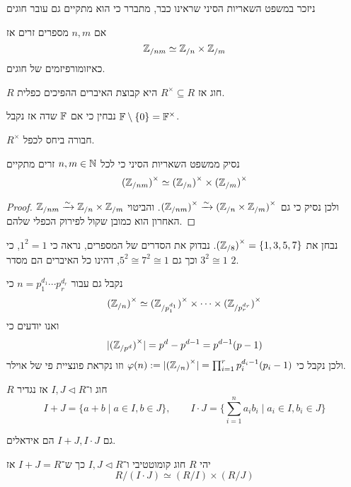ניזכר במשפט השאריות הסיני שראינו כבר, מתברר כי הוא מתקיים גם עובר חוגים
\begin{theorem}
	אם $n, m$ מספרים זרים אז
	\[
		\mathbb{Z}_{/nm} \simeq \mathbb{Z}_{/n} \times \mathbb{Z}_{/m}
	\]
	כאיזומורפיזמים של חוגים.
\end{theorem}
\begin{definition}
	$R$ חוג אז $R^\times \subseteq R$ היא קבוצת האיברים ההפיכים כפלית.
\end{definition}
נבחין כי אם $\mathbb{F}$ שדה אז נקבל $\mathbb{F} \setminus \{ 0 \} = \mathbb{F}^\times$.
\begin{proposition}
	$R^\times$ חבורה ביחס לכפל.
\end{proposition}
\begin{conclusion}
	נסיק ממשפט השאריות הסיני כי לכל $n, m \in \mathbb{N}$ זרים מתקיים
	\[
		{(\mathbb{Z}_{/nm})}^\times \simeq {(\mathbb{Z}_{/n})}^\times \times {(\mathbb{Z}_{/m})}^\times
	\]
\end{conclusion}
\begin{proof}
	$\mathbb{Z}_{/nm} \xrightarrow{\sim} \mathbb{Z}_{/n} \times \mathbb{Z}_{/m}$
	ולכן נסיק כי גם ${(\mathbb{Z}_{/nm})}^\times \xrightarrow{\sim} {(\mathbb{Z}_{/n} \times \mathbb{Z}_{/m})}^\times$.
	והביטוי האחרון הוא כמובן שקול לפירוק הכפלי שלהם.
\end{proof}
\begin{example}
	נבחן את ${(\mathbb{Z}_{/8})}^\times = \{ 1, 3, 5, 7 \}$.
	נבדוק את הסדרים של המספרים, נראה כי $1^2 = 1$, כי $3^2 \cong 1$ וכך גם $5^2 \cong 7^2 \cong 1$, דהינו כל האיברים הם מסדר $2$.
\end{example}
\begin{example}
	נקבל גם עבור $n = p_1^{d_1} \cdots p_r^{d_r}$ כי
	\[
		{(\mathbb{Z}_{/n})}^\times \simeq {(\mathbb{Z}_{/p_1^{d_1}})}^\times \times \cdots \times {(\mathbb{Z}_{/p_r^{d_r}})}^\times 
	\]
	ואנו יודעים כי
	\[
		|{(\mathbb{Z}_{/p^{d}})}^\times| = p^d - p^{d - 1} = p^{d - 1}(p - 1)
	\]
	ולכן נקבל כי $\varphi(n) := |{(\mathbb{Z}_{/n})}^\times| = \prod_{i = 1}^r p_i^{d_i - 1} (p_i - 1)$ וזו נקראת פונציית פי של אוילר.
\end{example}
\begin{definition}
	$R$ חוג ו־$I, J \triangleleft R$ אז נגדיר
	\[
		I + J = \{ a + b \mid a \in I, b \in J \},
		\qquad
		I \cdot J = \{ \sum_{i = 1}^{n} a_i b_i \mid a_i \in I, b_i \in J \}
	\]
\end{definition}
\begin{proposition}
	גם $I + J, I \cdot J$ הם אידאלים.
\end{proposition}
\begin{theorem}
	יהי $R$ חוג קומוטטיבי ו־$I, J \triangleleft R$ כך ש־$I + J = R$ אז
	\[
		R / (I \cdot J) \simeq (R / I) \times (R / J)
	\]
\end{theorem}
